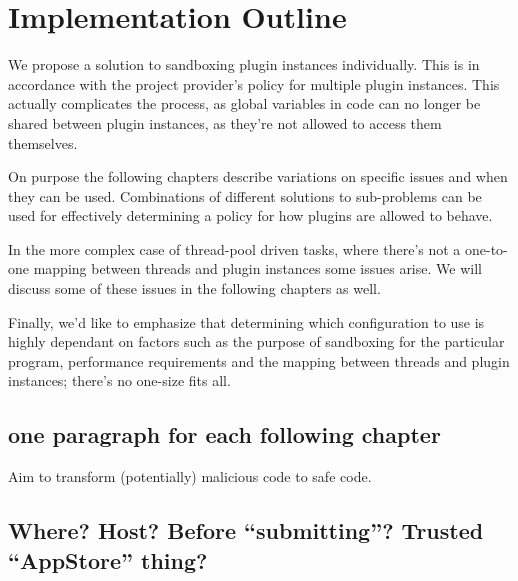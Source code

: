 \chapter {Implementation Outline}

We propose a solution to sandboxing plugin instances individually. This is in
accordance with the project provider's policy for multiple plugin instances.
This actually complicates the process, as global variables in code can no
longer be shared between plugin instances, as they're not allowed to access
them themselves.

On purpose the following chapters describe variations on specific issues and
when they can be used. Combinations of different solutions to sub-problems can
be used for effectively determining a policy for how plugins are allowed to
behave.

In the more complex case of thread-pool driven tasks, where there's not a
one-to-one mapping between threads and plugin instances some issues arise. We
will discuss some of these issues in the following chapters as well.

Finally, we'd like to emphasize that determining which configuration to use is
highly dependant on factors such as the purpose of sandboxing for the
particular program, performance requirements and the mapping between threads
and plugin instances; there's no one-size fits all.

\section {one paragraph for each following chapter}

Aim to transform (potentially) malicious code to safe code.

\section {Where? Host? Before ``submitting''? Trusted ``AppStore'' thing?}


